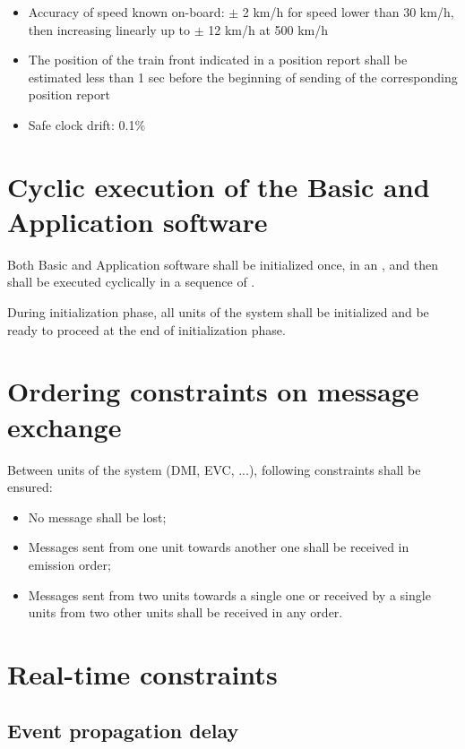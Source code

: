 \begin{itemize}
\item Accuracy of speed known on-board: $\pm$ 2 km/h for speed lower
  than 30 km/h, then increasing linearly up to $\pm$ 12 km/h at 500 km/h

\item The position of the train front indicated in a position report
  shall be estimated less than 1 sec before the beginning of sending
  of the corresponding position report

\item Safe clock drift: 0.1\%

\end{itemize}

\section{Cyclic execution of the Basic and Application software}

Both Basic and Application software shall be initialized once, in an
, and then shall be executed cyclically
in a sequence of .

During initialization phase, all units of the system shall be
initialized and be ready to proceed at the end of initialization
phase.

\section{Ordering constraints on message exchange}
\label{sec:ordering-constraints}

Between units of the system (DMI, EVC, ...), following constraints
shall be ensured:
\begin{itemize}
\item No message shall be lost;
\item Messages sent from one unit towards another one shall be
  received in emission order;
\item Messages sent from two units towards a
single one or received by a single units from two other units shall be
received in any order.
\end{itemize}

\section{Real-time constraints}

\subsection{Event propagation delay}
\label{sec:event-propagation-delay}

